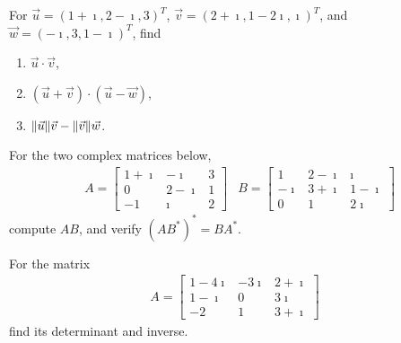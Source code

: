 \begin{Exercise}
For $\vec{u} = (1+\imath, 2-\imath, 3)^T$, $\vec{v} = (2+\imath, 1-2\imath, \imath)^T$, and $\vec{w} = (-\imath, 3, 1-\imath)^T$, find
\begin{enumerate}[label=(\alph*)]
\item $\vec{u} \cdot \vec{v}$,
\item $(\vec{u} + \vec{v}) \cdot (\vec{u} - \vec{w})$,
\item $\norm{\vec{u}} \vec{v} - \norm{\vec{v}} \vec{w}$.
\end{enumerate}
\end{Exercise}

\begin{Exercise}
For the two complex matrices below,
\begin{align*}
& A=
\begin{bmatrix}
1+\imath & -\imath & 3 \\
0 & 2-\imath & 1 \\
-1 & \imath & 2
\end{bmatrix}
& B=
\begin{bmatrix}
1 & 2-\imath & \imath \\
-\imath & 3+\imath & 1-\imath \\
0 & 1 & 2\imath
\end{bmatrix}
\end{align*}
compute $AB$, and verify $(AB^*)^* = BA^*$.
\end{Exercise}

\begin{Exercise}
For the matrix
\begin{align*}
A=
\begin{bmatrix}
1-4\imath & -3\imath & 2+\imath \\
1-\imath & 0 & 3\imath \\
-2 & 1 & 3+\imath
\end{bmatrix}    
\end{align*}
find its determinant and inverse.
\end{Exercise}